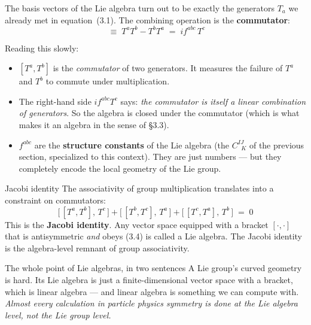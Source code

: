 \documentclass[11pt]{article}
\begin{document}
The basis vectors of the Lie algebra turn out to be exactly the
generators $T_a$ we already met in equation~(3.1). The combining
operation is the \textbf{commutator}:
\begin{equation}
  [T^a, T^b] \;\equiv\; T^a T^b - T^b T^a \;=\; i f^{abc}\, T^c
  \tag{3.3}
\end{equation}

Reading this slowly:
\begin{itemize}[leftmargin=1.5em, itemsep=3pt]
  \item $[T^a, T^b]$ is the \emph{commutator} of two generators. It
    measures the failure of $T^a$ and $T^b$ to commute under
    multiplication.
  \item The right-hand side $i f^{abc} T^c$ says: \emph{the commutator
    is itself a linear combination of generators}. So the algebra is
    closed under the commutator (which is what makes it an algebra in
    the sense of \S3.3).
  \item $f^{abc}$ are the \textbf{structure constants} of the Lie
    algebra (the $C^{IJ}_{\;\;K}$ of the previous section, specialized
    to this context). They are just numbers --- but they completely
    encode the local geometry of the Lie group.
\end{itemize}

\begin{keybox}{Jacobi identity}
The associativity of group multiplication translates into a constraint
on commutators:
\begin{equation}
  \big[\,[T^a, T^b],\, T^c\,\big] + \big[\,[T^b, T^c],\, T^a\,\big] +
  \big[\,[T^c, T^a],\, T^b\,\big] \;=\; 0
  \tag{3.4}
\end{equation}
This is the \textbf{Jacobi identity}. Any vector space equipped with a
bracket $[\cdot,\cdot]$ that is antisymmetric \emph{and} obeys (3.4) is
called a Lie algebra. The Jacobi identity is the algebra-level remnant
of group associativity.
\end{keybox}

\begin{intuitionbox}{The whole point of Lie algebras, in two sentences}
A Lie group's curved geometry is hard. Its Lie algebra is just a
finite-dimensional vector space with a bracket, which is linear algebra
--- and linear algebra is something we can compute with. \emph{Almost
every calculation in particle physics symmetry is done at the Lie
algebra level, not the Lie group level.}
\end{intuitionbox}
\end{document}

